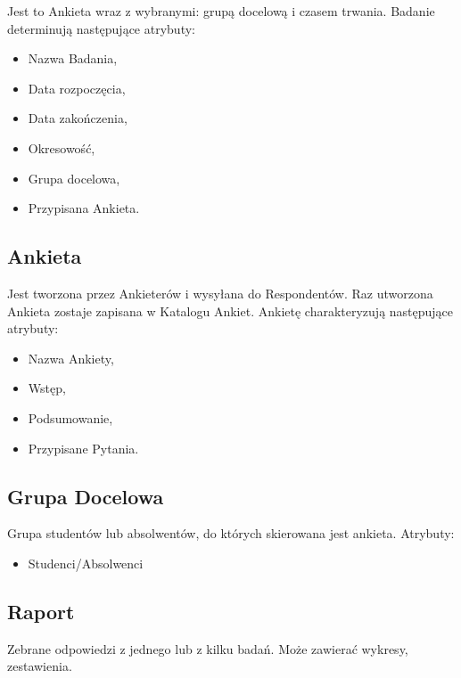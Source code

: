 Jest to Ankieta wraz z wybranymi: grupą docelową i czasem trwania. Badanie determinują następujące atrybuty:

\begin{itemize}
\item Nazwa Badania,
\item Data rozpoczęcia,
\item Data zakończenia,
\item Okresowość,
\item Grupa docelowa,
\item Przypisana Ankieta.
\end{itemize}

\subsection{Ankieta}

Jest tworzona przez Ankieterów i wysyłana do Respondentów. Raz utworzona Ankieta zostaje zapisana w Katalogu Ankiet. Ankietę charakteryzują następujące atrybuty:

\begin{itemize}
\item Nazwa Ankiety,
\item Wstęp,
\item Podsumowanie,
\item Przypisane Pytania.
\end{itemize}

\subsection{Grupa Docelowa}

Grupa studentów lub absolwentów, do których skierowana jest ankieta. Atrybuty:

\begin{itemize}
\item Studenci\slash Absolwenci
\end{itemize}

\subsection{Raport}

Zebrane odpowiedzi z jednego lub z kilku badań. Może zawierać wykresy, zestawienia.


%

